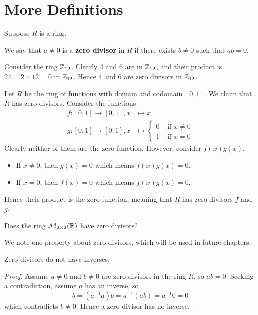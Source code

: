 \section{More Definitions}
Suppose $R$ is a ring.
\begin{definition}
    We say that $a \neq 0$ is a \textbf{zero divisor} in $R$ if there exists $b \neq 0$ such that $ab = 0$.
\end{definition}
\begin{example}
    Consider the ring $\mathbb{Z}_{12}$. Clearly 4 and 6 are in $\mathbb{Z}_{12}$, and their product is $24 = 2 \times 12 = 0$ in $\mathbb{Z}_{12}$. Hence 4 and 6 are zero divisors in $\mathbb{Z}_{12}$.
\end{example}
\begin{example}
    Let $R$ be the ring of functions with domain and codomain $[0, 1]$. We claim that $R$ has zero divisors. Consider the functions
    \begin{align*}
        f:[0,1]\to[0,1], x &\mapsto x\\
        g:[0,1]\to[0,1], x &\mapsto \begin{cases}
            0 & \text{ if } x \neq 0\\
            1 & \text{ if } x = 0
        \end{cases}
    \end{align*}
    Clearly neither of them are the zero function. However, consider $f(x)g(x)$.
    \begin{itemize}
        \item If $x \neq 0$, then $g(x) = 0$ which means $f(x)g(x) = 0$.
        \item If $x = 0$, then $f(x) = 0$ which means $f(x)g(x) = 0$.
    \end{itemize}
    Hence their product is the zero function, meaning that $R$ has zero divisors $f$ and $g$.
\end{example}
\begin{exercise}
    Does the ring $\mathcal{M}_{2\times2}(\mathbb{R})$ have zero divisors?
\end{exercise}
We note one property about zero divisors, which will be used in future chapters.
\begin{proposition}\label{prop-zero-divisors-have-no-inverses}
    Zero divisors do not have inverses.
\end{proposition}
\begin{proof}
    Assume $a \neq 0$ and $b \neq 0$ are zero divisors in the ring $R$, so $ab = 0$. Seeking a contradiction, assume $a$ has an inverse, so
    \[
        b = (a^{-1}a)b = a^{-1}(ab) = a^{-1}0 = 0    
    \]
    which contradicts $b \neq 0$. Hence a zero divisor has no inverse.
\end{proof}

